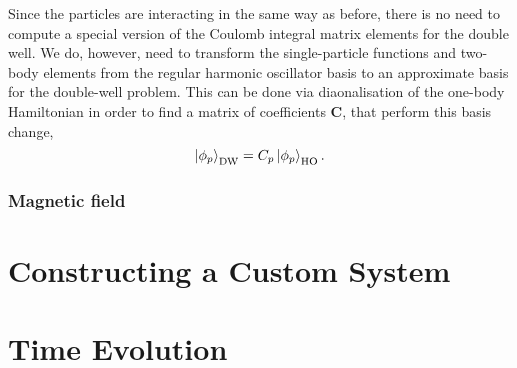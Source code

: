 Since the particles are interacting in the same way as before, there is no need 
to compute a special version of the Coulomb integral matrix elements for the 
double well. We do, however, need to transform the single-particle functions and 
two-body elements from the regular harmonic oscillator basis to an approximate basis 
for the double-well problem. This can be done via diaonalisation of the one-body 
Hamiltonian in order to find a matrix of coefficients $\mathbf{C}$, that perform 
this basis change,
\begin{equation}
    \ket{\phi_p}_\text{DW} = C_p \ket{\phi_p}_\text{HO}.
\end{equation}



\subsubsection{Magnetic field}



\section{Constructing a Custom System}

\section{Time Evolution}

